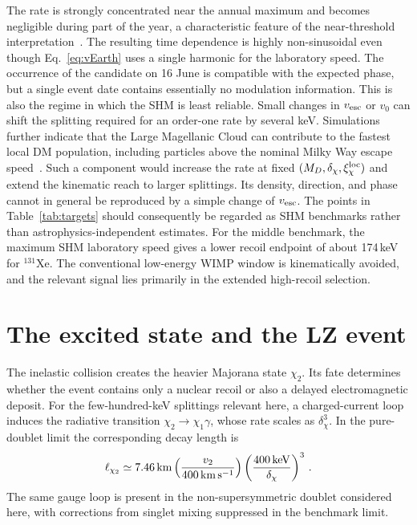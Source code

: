 \documentclass[aps,prd,reprint,preprintnumbers,superscriptaddress,nofootinbib,floatfix]{revtex4-2}
\newcommand{\dchi}{\delta_\chi}
\newcommand{\kms}{\,\mathrm{km\,s^{-1}}}
\begin{document}
The rate is strongly concentrated near the annual maximum and becomes negligible during part of the year, a characteristic feature of the near-threshold interpretation~\cite{McCabe:2026crm}. The resulting time dependence is highly non-sinusoidal even though Eq.~\eqref{eq:vEarth} uses a single harmonic for the laboratory speed. The occurrence of the candidate on 16 June is compatible with the expected phase, but a single event date contains essentially no modulation information. This is also the regime in which the SHM is least reliable. Small changes in $v_{\rm esc}$ or $v_0$ can shift the splitting required for an order-one rate by several keV. Simulations further indicate that the Large Magellanic Cloud can contribute to the fastest local DM population, including particles above the nominal Milky Way escape speed~\cite{Besla:2019xbx}. Such a component would increase the rate at fixed $(M_D,\dchi,\xi_\chi^{\rm loc})$ and extend the kinematic reach to larger splittings. Its density, direction, and phase cannot in general be reproduced by a simple change of $v_{\rm esc}$. The points in Table~\ref{tab:targets} should consequently be regarded as SHM benchmarks rather than astrophysics-independent estimates. For the middle benchmark, the maximum SHM laboratory speed gives a lower recoil endpoint of about 174\,keV for $^{131}$Xe. The conventional low-energy WIMP window is kinematically avoided, and the relevant signal lies primarily in the extended high-recoil selection.


\section{The excited state and the LZ event}
\label{sec:decay}

The inelastic collision creates the heavier Majorana state $\chi_2$. Its fate determines whether the event contains only a nuclear recoil or also a delayed electromagnetic deposit. For the few-hundred-keV splittings relevant here, a charged-current loop induces the radiative transition $\chi_2\to\chi_1\gamma$, whose rate scales as $\dchi^3$. In the pure-doublet limit the corresponding decay length is~\cite{Graham:2024syw}
\begin{equation}
    \ell_{\chi_2}\simeq7.46\,\mathrm{km} \left(\frac{v_2}{400\kms}\right)\left(\frac{400{\rm\,keV}}{\dchi}\right)^3\,.
    \label{eq:decaylength}
\end{equation}
The same gauge loop is present in the non-supersymmetric doublet considered here, with corrections from singlet mixing suppressed in the benchmark limit.
\end{document}
